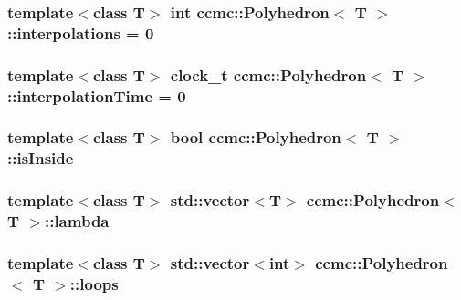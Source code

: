 \hypertarget{classccmc_1_1_polyhedron_a98484d47a61f7fb916e45a4d4c381d08}{
\subsubsection[{interpolations}]{\setlength{\rightskip}{0pt plus 5cm}template$<$class T$>$ int {\bf ccmc\-::\-Polyhedron}$<$ T $>$\-::interpolations = 0\hspace{0.3cm}{\ttfamily [static]}}}\label{classccmc_1_1_polyhedron_a98484d47a61f7fb916e45a4d4c381d08}
\hypertarget{classccmc_1_1_polyhedron_a436708606125ba1059465516aeb2b401}{
\subsubsection[{interpolation\-Time}]{\setlength{\rightskip}{0pt plus 5cm}template$<$class T$>$ clock\-\_\-t {\bf ccmc\-::\-Polyhedron}$<$ T $>$\-::interpolation\-Time = 0\hspace{0.3cm}{\ttfamily [static]}}}\label{classccmc_1_1_polyhedron_a436708606125ba1059465516aeb2b401}
\hypertarget{classccmc_1_1_polyhedron_a54e8c54feeac70b1bd3c1eaf4c237058}{
\subsubsection[{is\-Inside}]{\setlength{\rightskip}{0pt plus 5cm}template$<$class T$>$ bool {\bf ccmc\-::\-Polyhedron}$<$ T $>$\-::is\-Inside}}\label{classccmc_1_1_polyhedron_a54e8c54feeac70b1bd3c1eaf4c237058}
\hypertarget{classccmc_1_1_polyhedron_ae398caeb579041f8da9261484deb4eed}{
\subsubsection[{lambda}]{\setlength{\rightskip}{0pt plus 5cm}template$<$class T$>$ std\-::vector$<$T$>$ {\bf ccmc\-::\-Polyhedron}$<$ T $>$\-::lambda}}\label{classccmc_1_1_polyhedron_ae398caeb579041f8da9261484deb4eed}
\hypertarget{classccmc_1_1_polyhedron_a275e8b1b13a16013da6bd125e203fd2c}{
\subsubsection[{loops}]{\setlength{\rightskip}{0pt plus 5cm}template$<$class T$>$ std\-::vector$<$int$>$ {\bf ccmc\-::\-Polyhedron}$<$ T $>$\-::loops}}\label{classccmc_1_1_polyhedron_a275e8b1b13a16013da6bd125e203fd2c}
